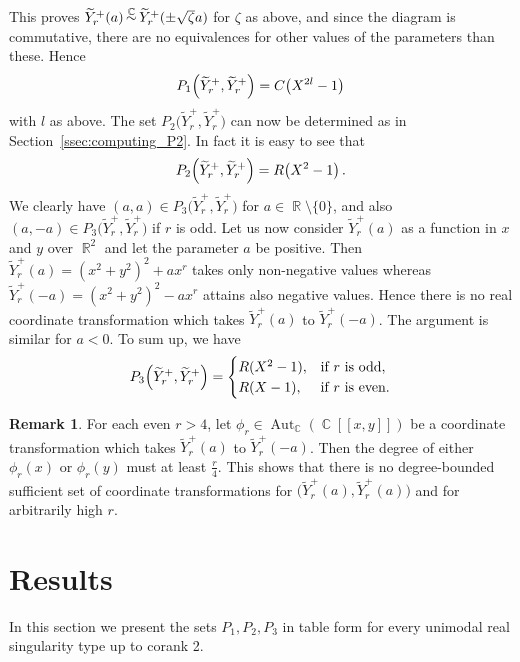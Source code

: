 \documentclass[noend]{amsproc}
\theoremstyle{definition}
\newtheorem{remark}[theorem]{Remark}
\let\originalleft\left
\let\originalright\right
\renewcommand{\left}{\mathopen{}\mathclose\bgroup\originalleft}
\renewcommand{\right}{\aftergroup\egroup\originalright}
\newcommand{\tY}{\widetilde{Y}}
\DeclareMathOperator{\csim}{\mathrel{\smash{\overset{\C}{\sim}}}}
\DeclareMathOperator{\R}{\mathbb{R}}
\DeclareMathOperator{\C}{\mathbb{C}}
\DeclareMathOperator{\Aut}{Aut}
\begin{document}
This proves $\tY_r^+(a) \csim \tY_r^+(\pm \sqrt{\zeta}a)$ for $\zeta$ as above,
and since the diagram is commutative, there are no equivalences for other
values of the parameters than these. Hence
\[
P_1\left(\tY_r^+, \tY_r^+\right) = C\left(X^{2l}-1\right)
\]
with $l$ as above. The set $P_2\bigl(\tY_r^+, \tY_r^+\bigr)$ can now be
determined as in Section~\ref{ssec:computing_P2}. In fact it is easy to see
that
\[
P_2\left(\tY_r^+, \tY_r^+\right) = R\left(X^2-1\right) \,.
\]
We clearly have $(a, a) \in P_3\bigl(\tY_r^+, \tY_r^+\bigr)$ for
$a \in \R \setminus \{0\}$, and also
$(a, -a) \in P_3\bigl(\tY_r^+, \tY_r^+\bigr)$ if $r$ is odd. Let us now
consider $\tY_r^+(a)$ as a function in $x$ and $y$ over $\R^2$ and let the
parameter $a$ be positive.  Then $\tY_r^+(a) = (x^2+y^2)^2+ax^r$ takes only
non-negative values whereas $\tY_r^+(-a) = (x^2+y^2)^2-ax^r$ attains also
negative values.  Hence there is no real coordinate transformation which takes
$\tY_r^+(a)$ to $\tY_r^+(-a)$.  The argument is similar for $a < 0$. To sum up,
we have
\[
P_3\left(\tY_r^+, \tY_r^+\right) =
\begin{cases}
R(X^2-1), &\text{if } r \text{ is odd}, \\
R(X-1),   &\text{if } r \text{ is even}.
\end{cases}
\]

\begin{remark}\label{rem:sufficient_sets_for_Yr}
For each even $r > 4$, let $\phi_r \in \Aut_{\C}(\C[[x,y]])$ be a coordinate
transformation which takes $\tY_r^+(a)$ to $\tY_r^+(-a)$. Then the degree of
either $\phi_r(x)$ or $\phi_r(y)$ must at least $\frac{r}{4}$. This shows that
there is no degree-bounded sufficient set of coordinate transformations for
$\bigl(\tY_r^+(a), \tY_r^+(a)\bigr)$ and for arbitrarily high $r$.
\end{remark}


\section{Results}\label{sec:results}

In this section we present the sets $P_1,P_2,P_3$ in table form for every
unimodal real singularity type up to corank 2.
\end{document}
